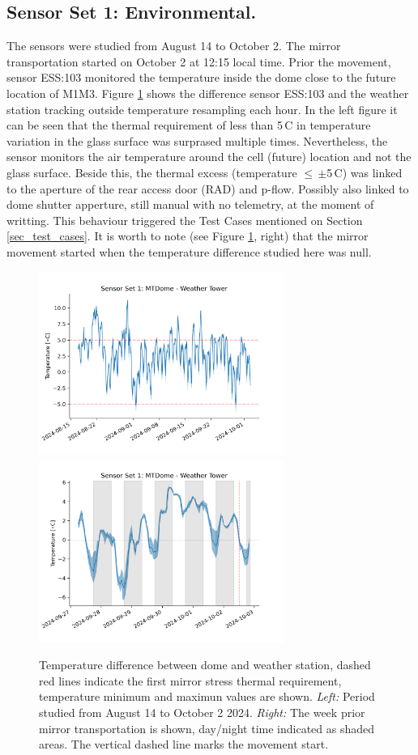 \documentclass[SE,lsstdraft,authoryear,toc]{lsstdoc}
\begin{document}
\subsection{Sensor Set 1: Environmental.}
The sensors were studied from August 14 to October 2. The mirror transportation started on October 2 at 12:15 local time. Prior the movement, sensor ESS:103 monitored the temperature inside the dome close to the future location of M1M3. Figure \ref{fig_set1_difference} shows the difference sensor ESS:103 and the weather station tracking outside temperature resampling each hour. In the left figure it can be seen that the thermal requirement of less than 5\,\textdegree C in temperature variation in the glass surface was surprased multiple times. Nevertheless, the sensor monitors the air temperature around the cell (future) location and not the glass surface. Beside this, the thermal excess (temperature $\leq$\,$\pm$5\,\textdegree C) was linked to the aperture of the rear access door (RAD) and p-flow. Possibly also linked to dome shutter apperture, still manual with no telemetry, at the moment of writting. This behaviour triggered the Test Cases mentioned on Section \ref{sec_test_cases}. It is worth to note (see Figure \ref{fig_set1_difference}, right) that the mirror movement started when the temperature difference studied here was null.

\begin{figure}[h!]
  \includegraphics[width=8cm]{SITCOMTN-141_figures/Sensor1_1h_delta_temp.png}
  \includegraphics[width=8cm]{SITCOMTN-141_figures/Sensor1_1h_delta_temp_moment.png}
  \caption{Temperature difference between dome and weather station, dashed red lines indicate the first mirror stress thermal requirement, temperature minimum and maximun values are shown. \textit{Left:} Period studied from August 14 to October 2 2024. \textit{Right:} The week prior mirror transportation is shown, day/night time indicated as shaded areas. The vertical dashed line marks the movement start.}
  \label{fig_set1_difference}
\end{figure}
\end{document}
